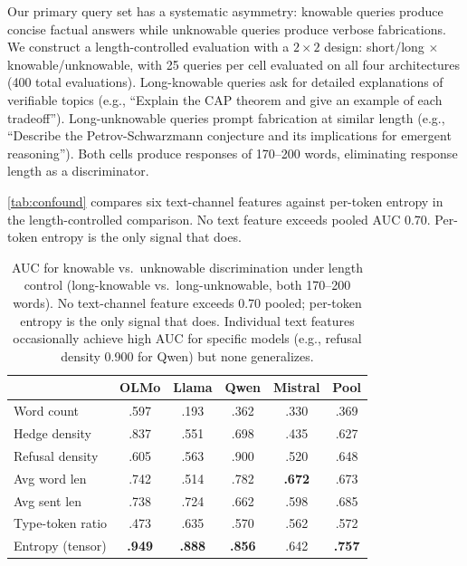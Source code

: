 Our primary query set has a systematic asymmetry: knowable queries produce
concise factual answers while unknowable queries produce verbose fabrications.
We construct a length-controlled evaluation with a $2 \times 2$ design:
short/long $\times$ knowable/unknowable, with 25 queries per cell evaluated on
all four architectures (400 total evaluations). Long-knowable queries ask for
detailed explanations of verifiable topics (e.g., ``Explain the CAP theorem
and give an example of each tradeoff''). Long-unknowable queries prompt
fabrication at similar length (e.g., ``Describe the Petrov-Schwarzmann
conjecture and its implications for emergent reasoning''). Both cells produce
responses of 170--200 words, eliminating response length as a discriminator.

\autoref{tab:confound} compares six text-channel features against per-token
entropy in the length-controlled comparison. No text feature exceeds pooled
AUC 0.70. Per-token entropy is the only signal that does.

\begin{table}[t]
\centering
\small
\caption{AUC for knowable vs.\ unknowable discrimination under length control
(long-knowable vs.\ long-unknowable, both 170--200 words). No text-channel
feature exceeds 0.70 pooled; per-token entropy is the only signal that does.
Individual text features occasionally achieve high AUC for specific models
(e.g., refusal density 0.900 for Qwen) but none generalizes.}
\label{tab:confound}
\begin{tabular}{lccccc}
\toprule
 & \textbf{OLMo} & \textbf{Llama} & \textbf{Qwen} & \textbf{Mistral} & \textbf{Pool} \\
\midrule
Word count       & .597 & .193 & .362 & .330 & .369 \\
Hedge density    & .837 & .551 & .698 & .435 & .627 \\
Refusal density  & .605 & .563 & .900 & .520 & .648 \\
Avg word len     & .742 & .514 & .782 & \textbf{.672} & .673 \\
Avg sent len     & .738 & .724 & .662 & .598 & .685 \\
Type-token ratio & .473 & .635 & .570 & .562 & .572 \\
\midrule
Entropy (tensor) & \textbf{.949} & \textbf{.888} & \textbf{.856} & .642 & \textbf{.757} \\
\bottomrule
\end{tabular}
\end{table}

